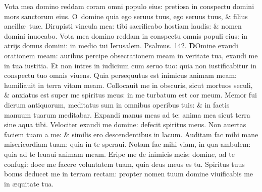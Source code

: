 \documentclass[a5paper,10pt]{book}
\def\ae{æ}
\begin{document}
\begin{multicols*}{2}
\newline \color{red} V\color{black}ota mea domino reddam coram omni populo eius: pretiosa in conspectu domini mors sanctorum eius.
\newline \color{red} O\color{black}\ domine quia ego seruus tuus, ego seruus tuus, \& filius ancill\ae \ tu\ae .
\newline \color{red} D\color{black}irupisti vincula mea: tibi sacrificabo hostiam laudis: \& nomen domini inuocabo.
\newline \color{red} V\color{black}ota mea domino reddam in conspectu omnis populi eius: in atrijs domus domini: in medio tui Ierusalem.
\newline \color{red} Psalmus. \hypertarget{ps142}{142.} \color{black}
\vspace{-1em}
\lettrine[lines=2]{\bfseries \color{red} D}{}Omine exaudi orationem meam: auribus percipe obsecrationem meam in veritate tua, exaudi me in tua iustitia.
\newline \color{red} E\color{black}t non intres in iudicium cum seruo tuo: quia non iustificabitur in conspectu tuo omnis viuens.
\newline \color{red} Q\color{black}uia persequutus est inimicus animam meam: humiliauit in terra vitam meam.
\newline \color{red} C\color{black}ollocauit me in obscuris, sicut mortuos seculi, \& anxiatus est super me spiritus meus: in me turbatum est cor meum.
\newline \color{red} M\color{black}emor fui dierum antiquorum, meditatus sum in omnibus operibus tuis: \& in factis manuum tuarum meditabar.
\newline \color{red} E\color{black}xpandi manus meas ad te: anima mea sicut terra sine aqua tibi.
\newline \color{red} V\color{black}elociter exaudi me domine: defecit spiritus meus.
\newline \color{red} N\color{black}on auertas faciem tuam a me: \& similis ero descendentibus in lacum.
\newline \color{red} A\color{black}uditam fac mihi mane misericordiam tuam: quia in te speraui.
\newline \color{red} N\color{black}otam fac mihi viam, in qua ambulem: quia ad te leuaui animam meam.
\newline \color{red} E\color{black}ripe me de inimicis meis: domine, ad te confugi: doce me facere voluntatem tuam, quia deus meus es tu.
\newline \color{red} S\color{black}piritus tuus bonus deducet me in terram rectam: propter nomen tuum domine viuificabis me in \ae quitate tua.

\end{multicols*}
\end{document}
